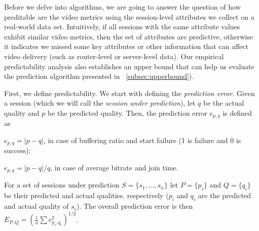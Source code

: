 \label{predictability}

Before we delve into algorithms, we are going to answer the question of how preditable are the video metrics using the session-level attributes we collect on a real-world data set. Intuitively, if all sessions with the same attribute values exhibit similar video metrics, then the set of attributes are predictive, otherwise it indicates we missed some key attributes or other information that can affect video delivery (such as router-level or server-level data). Our empirical predictability analysis also establishes an upper bound that can help us evaluate the prediction algorithm presented in \Section~\ref{subsec:upperbound}).

\label{subsec:upperbound}

First, we define predictability. We start with defining the {\it prediction error}.  Given a session
(which we will call the {\it session under prediction}), let $q$ be
the actual quality and $p$ be the predicted quality. Then, the
prediction error $e_{p,q}$ is defined as
\begin{packeditemize}
	\item $e_{p,q}=|p-q|$, in case of buffering ratio and start failure (1 is failure and 0 is success);
	\item $e_{p,q}=|p-q|/q$, in case of average bitrate and join time.
\end{packeditemize}

For a set of sessions under prediction $S=\{s_1,\dots,s_n\}$ let $P=\{p_i\}$ and $Q=\{q_i\}$ be their predicted and actual qualities. respectively ($p_i$ and $q_i$ are the predicted and actual quality of $s_i$). The overall prediction error is then $E_{P,Q}=\left(\frac{1}{n}\sum e_{p_i,q_i}^2\right)^{1/2}$.


